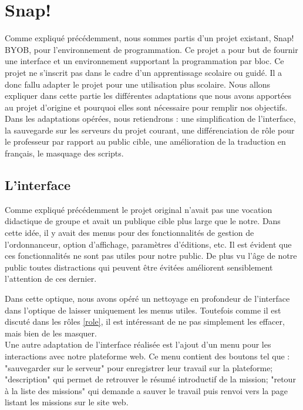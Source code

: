 \section{Snap!}
\label{solution SNAP}
Comme expliqué précédemment, nous sommes partis d'un projet existant, Snap! BYOB, pour l'environnement de programmation. Ce projet a pour but de fournir une interface et un environnement supportant la programmation par bloc. Ce projet ne s'inscrit pas dans le cadre d'un apprentissage scolaire ou guidé. Il a donc fallu adapter le projet pour une utilisation plus scolaire. Nous allons expliquer dans cette partie les différentes adaptations que nous avons apportées au projet d'origine et pourquoi elles sont nécessaire pour remplir nos objectifs.\\

Dans les adaptations opérées, nous retiendrons : une simplification de l'interface, la sauvegarde sur les serveurs du projet courant, une différenciation de rôle pour le professeur par rapport au public cible, une amélioration de la traduction en français, le masquage des scripts.

\subsection{L'interface}
\label{interface}
Comme expliqué précédemment le projet original n'avait pas une vocation didactique de groupe et avait un publique cible plus large que le notre. Dans cette idée, il y avait des menus pour des fonctionnalités de gestion de l'ordonnanceur, option d'affichage, paramètres d'éditions, etc. Il est évident que ces fonctionnalités ne sont pas utiles pour notre public. De plus vu l'âge de notre public toutes distractions qui peuvent être évitées améliorent sensiblement l'attention de ces dernier.

Dans cette optique, nous avons opéré un nettoyage en profondeur de l'interface dans l'optique de laisser uniquement les menus utiles. Toutefois comme il est discuté dans les rôles \ref{role}, il est intéressant de ne pas simplement les effacer, mais bien de les masquer.\\

Une autre adaptation de l'interface réalisée est l'ajout d'un menu pour les interactions avec notre plateforme web. Ce menu contient des boutons tel que : "sauvegarder sur le serveur" pour enregistrer leur travail sur la plateforme; "description" qui permet de retrouver le résumé introductif de la mission; "retour à la liste des missions" qui demande a sauver le travail puis renvoi vers la page listant les missions sur le site web.


